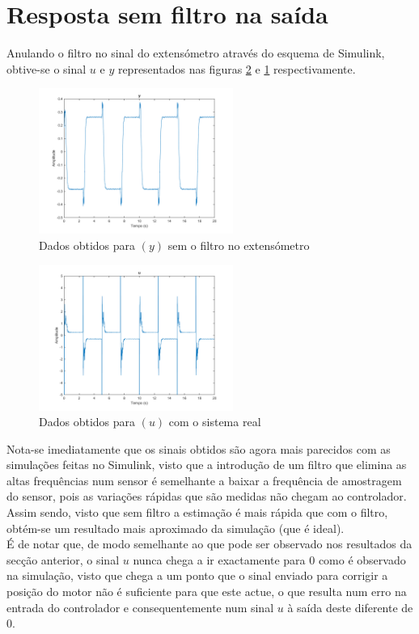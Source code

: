 \documentclass[%
  reprint,
  nofootinbib,
  amsmath,amssymb,
  aps,
  10pt,
  a4paper
]{revtex4-1}
\begin{document}
\section{Resposta sem filtro na saída}
Anulando o filtro no sinal do extensómetro através do esquema de Simulink, obtive-se o sinal $u$ e $y$ representados nas figuras \ref{fig:u_00} e \ref{fig:y_00} respectivamente.\\
\begin{figure}[H]
\includegraphics[width=2.5in]{../imgs/dados_00/dados_00_y.png}
\caption{Dados obtidos para $(y)$ sem o filtro no extensómetro}
\label{fig:y_00}
\end{figure}
\begin{figure}[H]
\includegraphics[width=2.5in]{../imgs/dados_00/dados_00_u.png}
\caption{Dados obtidos para $(u)$ com o sistema real}
\label{fig:u_00}
\end{figure}
Nota-se imediatamente que os sinais obtidos são agora mais parecidos com as simulações feitas no Simulink, visto que a introdução de um filtro que elimina as altas frequências num sensor é semelhante a baixar a frequência de amostragem do sensor, pois as variações rápidas que são medidas não chegam ao controlador. Assim sendo, visto que sem filtro a estimação é mais rápida que com o filtro, obtém-se um resultado mais aproximado da simulação (que é ideal).\\
É de notar que, de modo semelhante ao que pode ser observado nos resultados da secção anterior, o sinal $u$ nunca chega a ir exactamente para 0 como é observado na simulação, visto que chega a um ponto que o sinal enviado para corrigir a posição do motor não é suficiente para que este actue, o que resulta num erro na entrada do controlador e consequentemente num sinal $u$ à saída deste diferente de 0.
\end{document}
